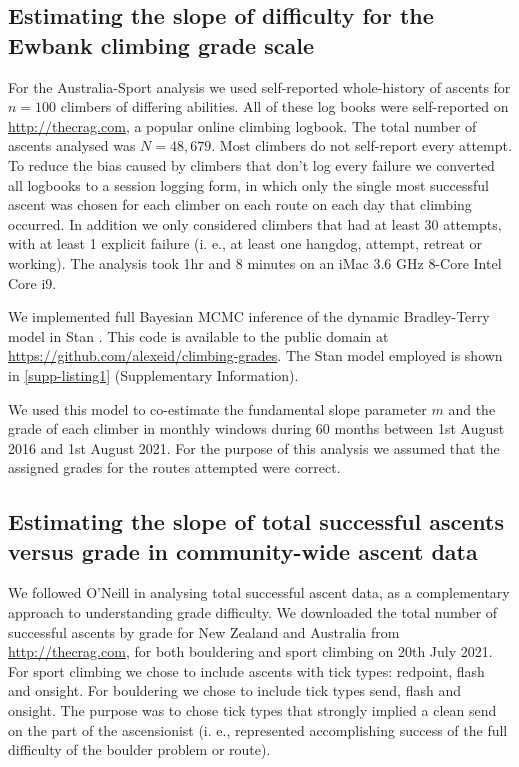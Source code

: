 \documentclass{article}
\begin{document}
\subsection*{Estimating the slope of difficulty for the Ewbank climbing grade scale}

For the Australia-Sport analysis we used self-reported whole-history of ascents for $n=100$ climbers of differing abilities. All of these log books were self-reported on \url{http://thecrag.com}, a popular online climbing logbook. The total number of ascents analysed was $N=48,679$. Most climbers do not self-report every attempt. To reduce the bias caused by climbers that don't log every failure we converted all logbooks to a session logging form, in which only the single most successful ascent was chosen for each climber on each route on each day that climbing occurred. In addition we only considered climbers that had at least 30 attempts, with at least 1 explicit failure (i. e., at least one \gls{hangdog}, attempt, retreat or working). The analysis took 1hr and 8 minutes on an iMac 3.6 GHz 8-Core Intel Core i9.

We implemented full Bayesian MCMC inference of the dynamic Bradley-Terry model in Stan \cite{carpenter2017stan}. This code is available to the public domain at \url{https://github.com/alexeid/climbing-grades}.
The Stan model employed is shown in \cref{supp-listing1} (Supplementary Information).

We used this model to co-estimate the fundamental slope parameter $m$ and the grade of each climber in monthly windows during 60 months between 1st August 2016 and 1st August 2021. For the purpose of this analysis we assumed that the assigned grades for the routes attempted were correct.

\subsection*{Estimating the slope of total successful ascents versus grade in community-wide ascent data}

We followed O'Neill \cite{oneill2002} in analysing total successful ascent data, as a complementary approach to understanding grade difficulty. We downloaded the total number of successful ascents by grade for New Zealand and Australia from \url{http://thecrag.com}, for both bouldering and sport climbing on 20th July 2021. For sport climbing we chose to include ascents with tick types: \gls{redpoint}, \gls{flash} and \gls{onsight}. For bouldering we chose to include tick types \gls{send}, \gls{flash} and \gls{onsight}. The purpose was to chose tick types that strongly implied a clean send on the part of the ascensionist (i. e., represented accomplishing success of the full difficulty of the boulder problem or route).
\end{document}
